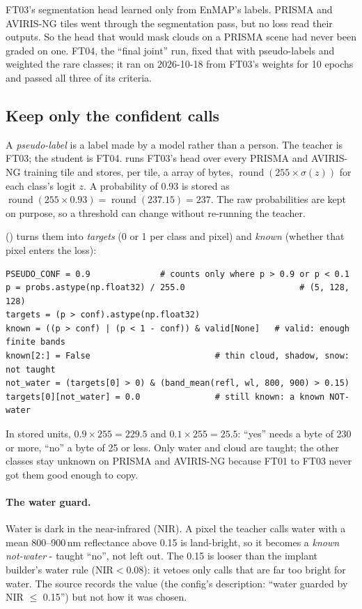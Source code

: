 FT03's segmentation head learned only from EnMAP's labels. PRISMA and AVIRIS-NG tiles went through the segmentation
pass, but no loss read their outputs. So the head that would mask clouds on a PRISMA scene had never been graded on
one. FT04, the ``final joint'' run, fixed that with pseudo-labels and weighted the rare classes; it ran on 2026-10-18
from FT03's weights for 10 epochs and passed all three of its criteria.

\subsection{Keep only the confident calls}

A \emph{pseudo-label} is a label made by a model rather than a person. The teacher is FT03; the student is FT04.
 runs FT03's head over every PRISMA and AVIRIS-NG training tile and stores, per tile, a
 array of bytes, $\operatorname{round}(255 \times \sigma(z))$ for each class's logit $z$. A
probability of 0.93 is stored as $\operatorname{round}(255 \times 0.93) = \operatorname{round}(237.15) = 237$. The raw
probabilities are kept on purpose, so a threshold can change without re-running the teacher.

 () turns them into \emph{targets} (0 or 1 per class and
pixel) and \emph{known} (whether that pixel enters the loss):

\begin{lstlisting}
PSEUDO_CONF = 0.9              # counts only where p > 0.9 or p < 0.1
p = probs.astype(np.float32) / 255.0                       # (5, 128, 128)
targets = (p > conf).astype(np.float32)
known = ((p > conf) | (p < 1 - conf)) & valid[None]   # valid: enough finite bands
known[2:] = False                         # thin cloud, shadow, snow: not taught
not_water = (targets[0] > 0) & (band_mean(refl, wl, 800, 900) > 0.15)
targets[0][not_water] = 0.0               # still known: a known NOT-water
\end{lstlisting}

In stored units, $0.9 \times 255 = 229.5$ and $0.1 \times 255 = 25.5$: ``yes'' needs a byte of 230 or more, ``no'' a
byte of 25 or less. Only water and cloud are taught; the other classes stay unknown on PRISMA and AVIRIS-NG because
FT01 to FT03 never got them good enough to copy.

\paragraph{The water guard.} 
Water is dark in the near-infrared (NIR). A pixel the teacher calls water with a mean 800--900\,nm reflectance above
0.15 is land-bright, so it becomes a \emph{known not-water} - taught ``no'', not left out. The 0.15 is looser than the
implant builder's water rule ($\text{NIR} < 0.08$): it vetoes only calls that are far too bright for water. The source
records the value (the config's description: ``water guarded by NIR $\le$ 0.15'') but not how it was chosen.

